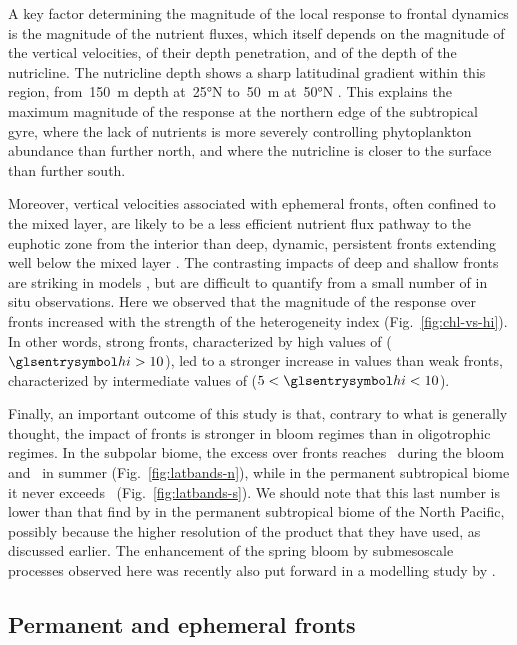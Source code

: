 A key factor determining the magnitude of the local  response to frontal dynamics is the magnitude of the nutrient fluxes, which itself depends on the magnitude of the vertical velocities, of their depth penetration, and of the depth of the nutricline.
The nutricline depth shows a sharp latitudinal gradient within this region, from~\qty{150}{\m} depth at~\ang{25}N to~\qty{50}{\m} at~\ang{50}N \parencite{romera-castillo_2016}.
This explains the maximum magnitude of the  response at the northern edge of the subtropical gyre, where the lack of nutrients is more severely controlling phytoplankton abundance than further north, and where the nutricline is closer to the surface than further south.

Moreover, vertical velocities associated with ephemeral fronts, often confined to the mixed layer, are likely to be a less efficient nutrient flux pathway to the euphotic zone from the interior than deep, dynamic, persistent fronts extending well below the mixed layer \parencite{levy_2018}.
The contrasting impacts of deep and shallow fronts are striking in models \parencite{levy_2012}, but are difficult to quantify from a small number of in situ observations.
Here we observed that the magnitude of the  response over fronts increased with the strength of the heterogeneity index  (Fig.~\ref{fig:chl-vs-hi}).
In other words, strong fronts, characterized by high values of  (\(\am{hi} > 10\)), led to a stronger increase in  values than weak fronts, characterized by intermediate values of  (\(5 < \am{hi} < 10\)).

Finally, an important outcome of this study is that, contrary to what is generally thought, the impact of fronts is stronger in bloom regimes than in oligotrophic regimes.
In the subpolar biome, the   excess over fronts reaches~ during the bloom and~ in summer (Fig.~\ref{fig:latbands-n}), while in the permanent subtropical biome it never exceeds~ (Fig.~\ref{fig:latbands-s}).
We should note that this last number is lower than that find by \textcite{liu_2016} in the permanent subtropical biome of the North Pacific, possibly because the higher resolution of the product that they have used, as discussed earlier.
The enhancement of the spring bloom by submesoscale processes observed here was recently also put forward in a modelling study by \textcite{simoes-sousa_2022}.

\subsection{Permanent and ephemeral fronts}

